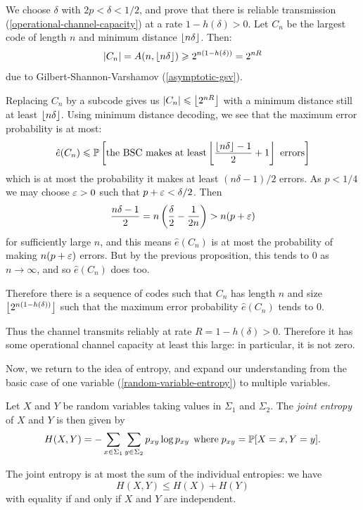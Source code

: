 \documentclass{article}
\begin{document}
\begin{prf}
    We choose $\delta$ with $2p < \delta < 1/2$,
    and prove that there is reliable transmission
    (\ref{operational-channel-capacity})
    at a rate $1 - h(\delta) > 0$.
    Let $C_n$ be the largest code of length $n$
    and minimum distance $\left\lfloor n \delta\right\rfloor$. Then:
    \[
	\left\lvert C_n \right\rvert = A(n, \left\lfloor n\delta\right\rfloor) \geqslant 2^{n(1-h(\delta))} = 2^{nR}
	\]
	due to Gilbert-Shannon-Varshamov (\ref{asymptotic-gsv}).
	
	Replacing $C_n$ by a subcode gives us $\left\lvert C_n \right\rvert \leqslant \left\lfloor2^{nR}\right\rfloor$
	with a minimum distance still at least $\left\lfloor n \delta\right\rfloor$.
	Using minimum distance decoding,
	we see that the maximum error probability is at most:
	\[
	\hat e(C_n) \leqslant
	\mathbb{P} \left[\text{the BSC makes at least}
	\left\lfloor\frac{\left\lfloor n\delta\right\rfloor - 1}{2} + 1\right\rfloor
	\text{ errors}\right]
	\]
	which is at most the probability it makes at least $(n\delta-1)/2$ errors.
	As $p < 1/4$ we may choose $\varepsilon > 0$ such that $p + \varepsilon < \delta/2$. Then
	\[
	\frac{n\delta-1}{2} =
	n \left( \frac{\delta}{2} - \frac{1}{2n} \right) >
	n (p + \varepsilon)
	\]
	for sufficiently large $n$,
	and this means $\hat e(C_n)$
	is at most the probability of making $n(p + \varepsilon)$ errors.
	But by the previous proposition,
	this tends to 0 as $n \to \infty$,
	and so $\hat e(C_n)$ does too.
	
	Therefore there is a sequence of codes such that
	$C_n$ has length $n$ and size $\left\lfloor2^{n(1 - h(\delta))}\right\rfloor$
	such that the maximum error probability $\hat e(C_n)$ tends to 0.
	
	Thus the channel transmits reliably at rate $R = 1 - h(\delta) > 0$.
	Therefore it has some operational channel capacity at least this large:
	in particular, it is not zero.
\end{prf}

Now, we return to the idea of entropy,
and expand our understanding from the basic case of one variable (\ref{random-variable-entropy})
to multiple variables.

\begin{definition}
	Let $X$ and $Y$ be random variables taking values in $\Sigma_1$ and $\Sigma_2$. 
	The \textit{joint entropy} of $X$ and $Y$ is then given by
    \[
	H(X, Y) =
	- \sum_{x \in \Sigma_1} \sum_{y \in \Sigma_2} p_{xy} \log p_{xy}
	\mathrel{\, \text{where}} p_{xy} = \mathbb{P}[X = x, Y = y].
	\]
\end{definition}

\begin{proposition}
	\label{joint-entropy-inequality}
    The joint entropy is at most the sum of the individual entropies:
    we have
    \[
	H(X, Y) \leq H(X) + H(Y)
	\]
	with equality if and only if $X$ and $Y$ are independent.
\end{proposition}
\end{document}
